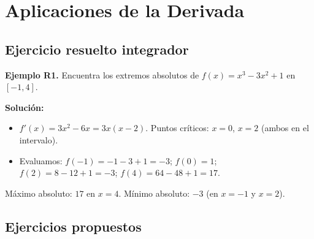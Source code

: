 \documentclass[12pt, a4paper]{article}
\begin{document}
\newpage

\section{Aplicaciones de la Derivada}

\subsection{Ejercicio resuelto integrador}

\textbf{Ejemplo R1.} Encuentra los extremos absolutos de $f(x) = x^3 - 3x^2 + 1$ en $[-1, 4]$.

\begin{cuadrosolucion}
  \textbf{Solución:}
  \begin{itemize}
    \item $f'(x) = 3x^2 - 6x = 3x(x - 2)$. Puntos críticos: $x = 0$, $x = 2$ (ambos en el intervalo).
    \item Evaluamos: $f(-1) = -1 - 3 + 1 = -3$; $f(0) = 1$; $f(2) = 8 - 12 + 1 = -3$; $f(4) = 64 - 48 + 1 = 17$.
  \end{itemize}
  Máximo absoluto: $17$ en $x = 4$. Mínimo absoluto: $-3$ (en $x = -1$ y $x = 2$).
\end{cuadrosolucion}

\subsection{Ejercicios propuestos}
\end{document}
